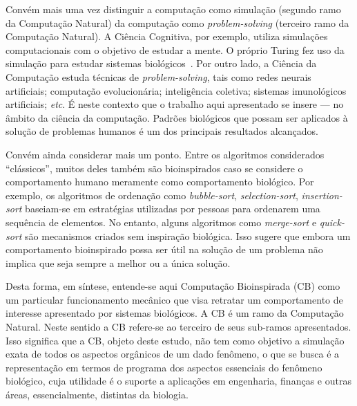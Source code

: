 
Convém mais uma vez distinguir a computação como simulação (segundo ramo da Computação Natural) da computação como \textit{problem-solving} (terceiro ramo da Computação Natural). A Ciência Cognitiva, por exemplo, utiliza simulações computacionais com o objetivo de estudar a mente. O próprio Turing fez uso da simulação para estudar sistemas biológicos~\cite{turing52}. Por outro lado, a Ciência da Computação estuda técnicas de \textit{problem-solving}, tais como redes neurais artificiais; computação evolucionária; inteligência coletiva; sistemas imunológicos artificiais; \textit{etc}. É neste contexto que o trabalho aqui apresentado se insere --- no âmbito da ciência da computação. Padrões biológicos que possam ser aplicados à solução de problemas humanos é um dos principais resultados alcançados. 


Convém ainda considerar mais um ponto. Entre os algoritmos considerados ``clássicos'', muitos deles também são bioinspirados caso se considere o comportamento humano meramente como comportamento biológico. Por exemplo, os algoritmos de ordenação como \textit{bubble-sort}, \textit{selection-sort}, \textit{insertion-sort} baseiam-se em estratégias utilizadas por pessoas para ordenarem uma sequência de elementos. No entanto, alguns algoritmos como \textit{merge-sort} e \textit{quick-sort} são mecanismos criados sem inspiração biológica. Isso sugere que embora um comportamento bioinspirado possa ser útil na solução de um problema não implica que seja sempre a melhor ou a única solução. 


Desta forma, em síntese, entende-se aqui Computação Bioinspirada (CB) como um particular funcionamento mecânico que visa retratar um comportamento de interesse apresentado por sistemas biológicos. A CB é um ramo da Computação Natural. Neste sentido a CB refere-se ao terceiro de seus sub-ramos apresentados.  Isso significa que a CB, objeto deste estudo, não tem como objetivo a simulação exata de todos os aspectos orgânicos de um dado fenômeno, o que se busca é a representação em termos de programa dos aspectos essenciais do fenômeno biológico, cuja utilidade é o suporte a aplicações em engenharia, finanças e outras áreas, essencialmente, distintas da biologia.


